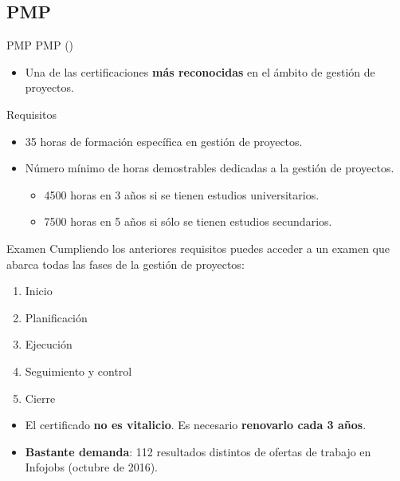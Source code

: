 \subsection{PMP}
\begin{frame}[allowframebreaks]{PMP}
	PMP ()
	\begin{itemize}
		\item Una de las certificaciones \textbf{más reconocidas} en el ámbito de gestión de proyectos.
	\end{itemize}
	
	\begin{block}{Requisitos}
		\begin{itemize}
			\item 35 horas de formación específica en gestión de proyectos.
			\item Número mínimo de horas demostrables dedicadas a la gestión de proyectos.
			\begin{itemize}
				\item 4500 horas en 3 años si se tienen estudios universitarios.
				\item 7500 horas en 5 años si sólo se tienen estudios secundarios.
			\end{itemize}
		\end{itemize}
	\end{block}
	
	\begin{block}{Examen}
		Cumpliendo los anteriores requisitos puedes acceder a un examen que abarca todas las fases de la gestión de proyectos:
		\begin{enumerate}
			\item Inicio
			\item Planificación
			\item Ejecución
			\item Seguimiento y control
			\item Cierre
		\end{enumerate}
	\end{block}
	
	\begin{itemize}
		\item El certificado \textbf{no es vitalicio}. Es necesario \textbf{renovarlo cada 3 años}.
		
		\item \textbf{Bastante demanda}: 112 resultados distintos de ofertas de trabajo en Infojobs (octubre de 2016).
	\end{itemize}
\end{frame}